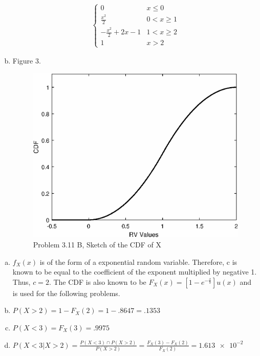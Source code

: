 \documentclass[12pt]{article}
\newenvironment{problem}[2][Problem]{\begin{trivlist}
\item[\hskip \labelsep {\bfseries #1}\hskip \labelsep {\bfseries #2.}]
  \vspace{1 cm}
}{\end{trivlist}}
\begin{document}
\begin{problem}{3.11}
\begin{enumerate}[a.]
\begin{align*}
\begin{cases}
            0 & x \leq 0 \\
            \frac{x^2}{2} & 0 < x \geq 1 \\
            -\frac{x^2}{2} + 2x - 1 & 1 < x \geq 2 \\
            1 & x > 2
          \end{cases}
      \end{align*}
    \item Figure 3.
     \begin{figure}[htpb]
       \centering
       \includegraphics[width=\textwidth,height=\textheight,keepaspectratio]{fig_3_11_b.eps}
       \caption{Problem 3.11 B, Sketch of the CDF of X}
     \end{figure}
  \end{enumerate}
\end{problem}

\begin{problem}{3.13}
\item
  \begin{enumerate}[a.]
    \item %
      $f_X(x)$ is of the form of a exponential random variable. Therefore,
      c is known to be equal to the coefficient of the exponent multiplied
      by negative 1. Thus, $c = 2$. The CDF is also known to be 
      $F_X(x) = \left[1 - e^{-\frac{x}{b}}\right]u(x)$ and is used for the 
      following problems. 
    \item %
      $P(X>2) = 1 - F_X(2) = 1 - .8647 = .1353$
    \item %
      $P(X<3) = F_X(3) = .9975$
    \item %
      $P(X < 3|X>2) = \frac{P(X<3)\cap P(X>2)}{P(X>2)}
      = \frac{F_X(3) - F_X(2)}{F_X(2)} = \num{1.613e-2}$
  \end{enumerate}
\end{problem}
\end{document}
